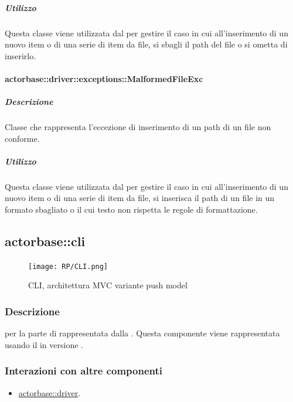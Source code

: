 \documentclass{scalatekids-article}
\begin{document}
\subparagraph{Utilizzo}

Questa classe viene utilizzata dal  per gestire il caso in cui all'inserimento di un nuovo item o di una serie di item da file, si sbagli il path del file o si ometta di inserirlo.

\paragraph{actorbase::driver::exceptions::MalformedFileExc}

\subparagraph{Descrizione}

Classe che rappresenta l'eccezione di inserimento di un path di un file non conforme.

\subparagraph{Utilizzo}

Questa classe viene utilizzata dal  per gestire il caso in cui all'inserimento di un nuovo item o di una serie di item da file, si inserisca il path di un file in un formato sbagliato o il cui testo non rispetta le regole di formattazione.



\subsection{actorbase::cli}
\label{sec:actorbase::cli}

\begin{figure}[H]
  \begin{center}
    \texttt{[image: RP/CLI.png]}
    \caption{CLI, architettura MVC variante push model}
  \end{center}
\end{figure}

\subsubsection{Descrizione}
 per la parte di  rappresentata dalla .
Questa componente viene rappresentata usando il 
 in versione .

\subsubsection{Interazioni con altre componenti}
\begin{itemize}
\item \hyperref[sec:actorbase::driver]{actorbase::driver}.
\end{itemize}
\end{document}
